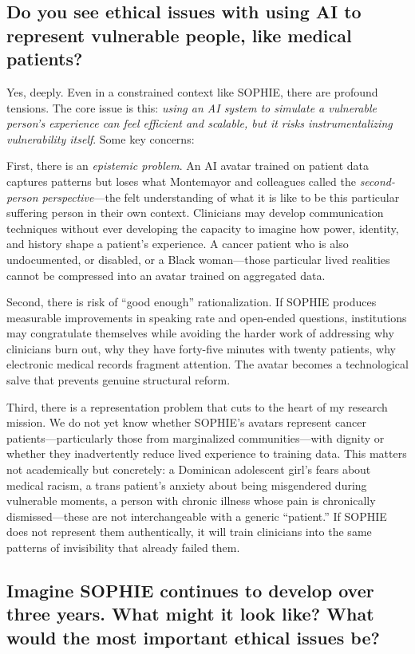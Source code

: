 \documentclass[12pt,twoside]{article}
\begin{document}
\subsection*{Do you see ethical issues with using AI to represent vulnerable people, like medical patients?}

Yes, deeply. Even in a constrained context like SOPHIE, there are profound tensions. The core issue is this: \emph{using an AI system to simulate a vulnerable person's experience can feel efficient and scalable, but it risks instrumentalizing vulnerability itself}. Some key concerns:

First, there is an \emph{epistemic problem}. An AI avatar trained on patient data captures patterns but loses what Montemayor and colleagues called the \emph{second-person perspective}—the felt understanding of what it is like to be this particular suffering person in their own context. Clinicians may develop communication techniques without ever developing the capacity to imagine how power, identity, and history shape a patient's experience. A cancer patient who is also undocumented, or disabled, or a Black woman—those particular lived realities cannot be compressed into an avatar trained on aggregated data.

Second, there is risk of \enquote{good enough} rationalization. If SOPHIE produces measurable improvements in speaking rate and open-ended questions, institutions may congratulate themselves while avoiding the harder work of addressing why clinicians burn out, why they have forty-five minutes with twenty patients, why electronic medical records fragment attention. The avatar becomes a technological salve that prevents genuine structural reform.

Third, there is a representation problem that cuts to the heart of my research mission. We do not yet know whether SOPHIE's avatars represent cancer patients—particularly those from marginalized communities—with dignity or whether they inadvertently reduce lived experience to training data. This matters not academically but concretely: a Dominican adolescent girl's fears about medical racism, a trans patient's anxiety about being misgendered during vulnerable moments, a person with chronic illness whose pain is chronically dismissed—these are not interchangeable with a generic \enquote{patient.} If SOPHIE does not represent them authentically, it will train clinicians into the same patterns of invisibility that already failed them.

\subsection*{Imagine SOPHIE continues to develop over three years. What might it look like? What would the most important ethical issues be?}
\end{document}
